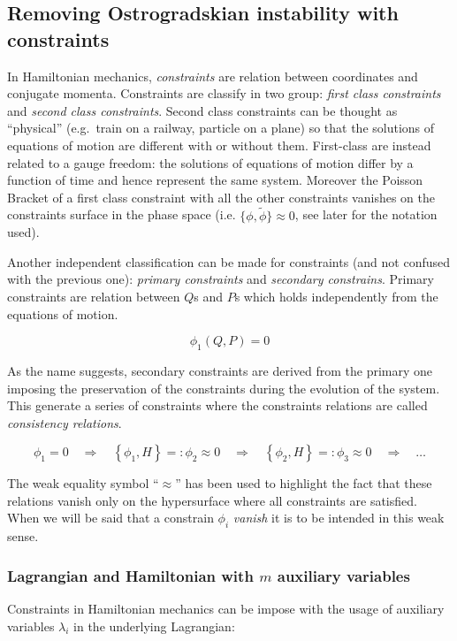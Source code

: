 \subsection{Removing Ostrogradskian instability with constraints}

In Hamiltonian mechanics, \emph{constraints} are relation between coordinates
and conjugate momenta. Constraints are classify in two group: \emph{first class
constraints} and \emph{second class constraints}. Second class constraints can
be thought as ``physical'' (e.g.\ train on a railway, particle on a plane) so
that the solutions of equations of motion are different with or without them.
First-class are instead related to a gauge freedom: the solutions of equations
of motion differ by a function of time and hence represent the same system.
Moreover the Poisson Bracket of a first class constraint with all the other
constraints vanishes on the constraints surface in the phase space (i.e.
$\{\phi, \tilde{\phi}\} \approx 0$, see later for the notation used).


Another independent classification can be made for constraints (and not confused
with the previous one): \emph{primary constraints} and \emph{secondary
constrains}.  Primary constraints are relation between $Q$s and $P$s which holds
independently from the equations of motion.

\begin{equation} \label{eq:constraint}
  \phi_1(Q, P) = 0
\end{equation}

As the name suggests, secondary constraints are derived from the primary one
imposing the preservation of the constraints during the evolution of the system.
This generate a series of constraints where the constraints relations are called
\emph{consistency relations}.

\begin{equation} \label{eq:consistency_relations}
  \phi_1 = 0 \quad \Rightarrow \quad
  \left\{ \phi_1 , H \right\} =: \phi_2 \approx 0 \quad \Rightarrow \quad
  \left\{ \phi_2 , H \right\} =: \phi_3 \approx 0 \quad \Rightarrow \quad
  \ldots
\end{equation}

The weak equality symbol ``$\approx$'' has been used to highlight the fact that
these relations vanish only on the hypersurface where all constraints are
satisfied. When we will be said that a constrain $\phi_i$ \emph{vanish} it is to
be intended in this weak sense.

\subsubsection{Lagrangian and Hamiltonian with $m$ auxiliary variables}
Constraints in Hamiltonian mechanics can be impose with the usage of auxiliary
variables $\lambda_i$ in the underlying Lagrangian:


